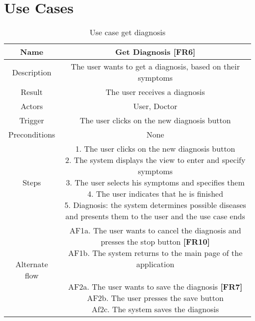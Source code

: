 \tocless\chapter{Use Cases}
\begin{table}[H]
	\begin{center}\scriptsize
		\def\arraystretch{2}%
		\begin{tabular}{ c|c } 
			\hline
			Name & Get Diagnosis \textbf{[FR6]}\\
			\hline	
			Description & The user wants to get a diagnosis, based on their symptoms \\ 
			\hline
			Result & The user receives a diagnosis \\ 
			\hline
			Actors & User, Doctor \\ 
			\hline
			Trigger & The user clicks on the new diagnosis button \\ 
			\hline
			Preconditions & None \\ 
			\hline
			Steps & \parbox{9cm}{\vspace{.5\baselineskip}
				1. The user clicks on the new diagnosis button\\
				2. The system displays the view to enter and specify symptoms\\
				3. The user selects his symptoms and specifies them\\
				4. The user indicates that he is finished\\
				5. Diagnosis: the system determines possible diseases and presents them to the user and the use case ends}\\
			\hline
			Alternate flow & \parbox{9cm}{
				AF1a. The user wants to cancel the diagnosis and presses the stop button \textbf{[FR10]}\\
				AF1b. The system returns to the main page of the application\\\\
				AF2a. The user wants to save the diagnosis \textbf{[FR7]}\\
				AF2b. The user presses the save button\\
				Af2c. The system saves the diagnosis
			}\\ 
			\hline
		\end{tabular}\normalsize
	\end{center}
	\caption{Use case get diagnosis}
\end{table}
